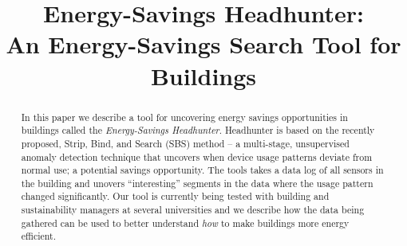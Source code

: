 \documentclass{sig-alternate-ipsn13}
\title{Energy-Savings Headhunter: \\An Energy-Savings Search Tool for Buildings}
\begin{document}
\maketitle

\begin{abstract}
In this paper we describe a tool for uncovering energy savings opportunities in buildings called 
the \emph{Energy-Savings Headhunter}.  Headhunter is based on the recently proposed, Strip, Bind, and
Search (SBS) method -- a multi-stage, unsupervised anomaly detection technique that uncovers when device
usage patterns deviate from normal use; a potential savings opportunity.  The tools
takes a data log of all sensors in the building and unovers ``interesting'' segments in the data
where the usage pattern changed significantly.  Our tool is 
currently being tested with building and sustainability managers at several universities and we  
describe how the data being gathered can be used to better understand \emph{how} to make buildings
more energy efficient.
\end{abstract}








\small


\end{document}

